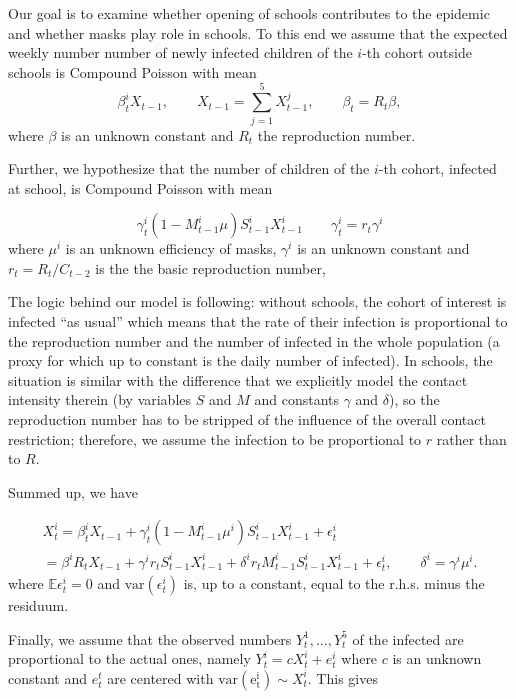 Our goal is to examine whether opening of schools contributes to the
epidemic and whether masks play role in schools. To this end we assume
that the expected weekly number number of newly infected children
of the $i$-th cohort outside schools is Compound Poisson with mean
\[
\beta_{t}^{i}X_{t-1},\qquad X_{t-1}=\sum_{j=1}^{5}X_{t-1}^{j},\qquad\beta_{t}=R_{t}\beta,
\]
where $\beta$ is an unknown constant and $R_{t}$ the reproduction
number.

Further, we hypothesize that the number of children of the $i$-th
cohort, infected at school, is Compound Poisson with mean 

\[
\gamma_{t}^{i}(1-M_{t-1}^{i}\mu)S_{t-1}^{i}X_{t-1}^{i}\qquad\gamma_{t}^{i}=r_{t}\gamma^{i}
\]
where $\mu^{i}$ is an unknown efficiency of masks, $\gamma^{i}$
is an unknown constant and $r_{t}=R_{t}/C_{t-2}$ is the the basic
reproduction number, 

The logic behind our model is following: without schools, the cohort
of interest is infected ``as usual'' which means that the rate of
their infection is proportional to the reproduction number and the
number of infected in the whole population (a proxy for which up to
constant is the daily number of infected). In schools, the situation
is similar with the difference that we explicitly model the contact
intensity therein (by variables $S$ and $M$ and constants $\gamma$
and $\delta$), so the reproduction number has to be stripped of the
influence of the overall contact restriction; therefore, we assume
the infection to be proportional to $r$ rather than to $R$.

Summed up, we have 

\begin{multline*}
X_{t}^{i}=\beta_{t}^{i}X_{t-1}+\gamma_{t}^{i}(1-M_{t-1}^{i}\mu^{i})S_{t-1}^{i}X_{t-1}^{i}+\epsilon_{t}^{i}\\
=\beta^{i}R_{t}X_{t-1}+\gamma^{i}r_{t}S_{t-1}^{i}X_{t-1}^{i}+\delta^{i}r_{t}M_{t-1}^{i}S_{t-1}^{i}X_{t-1}^{i}+\epsilon_{t}^{i},\qquad\delta^{i}=\gamma^{i}\mu^{i}.
\end{multline*}
where $\mathbb{E}\epsilon_{t}^{i}=0$ and $\mathrm{var}(\epsilon_{t}^{i})$
is, up to a constant, equal to the r.h.s. minus the residuum.

Finally, we assume that the observed numbers $Y_{t}^{1},\dots,Y_{t}^{5}$
of the infected are proportional to the actual ones, namely $Y_{t}^{i}=cX_{t}^{i}+e_{t}^{i}$
where $c$ is an unknown constant and $e_{t}^{t}$ are centered with
$\mathrm{var(e_{t}^{i})\sim}X_{t}^{i}$. This gives

